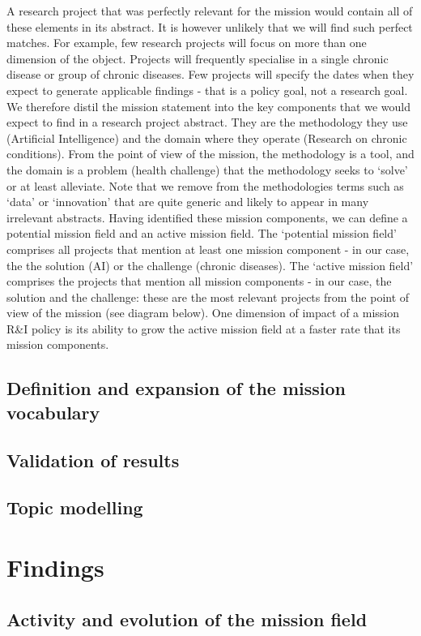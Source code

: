 \documentclass[11pt]{article}
\begin{document}
A research project that was perfectly relevant for the mission would contain all of these elements in its abstract. It is however unlikely that we will find such perfect matches. For example, few research projects will focus on more than one dimension of the object. Projects will frequently specialise in a single chronic disease or group of chronic diseases. Few projects will specify the dates when they expect to generate applicable findings - that is a policy goal, not a research goal. We therefore distil the mission statement into the key components that
we would expect to find in a research project abstract. They are the methodology they use (Artificial Intelligence) and the domain where they operate (Research on chronic conditions). From the point of view of the mission, the methodology is a tool, and the domain is a problem (health challenge) that the methodology seeks to `solve’ or at least alleviate. Note that we remove from the methodologies terms such as ‘data’ or ‘innovation’ that are quite generic and likely to appear in many irrelevant abstracts. Having identified these mission components, we can define a potential mission field and an active mission field. The `potential mission field' comprises all projects that mention at least one mission component - in our case, the the solution (AI) or the challenge (chronic diseases). The `active mission field’ comprises the projects that mention all mission components - in our case, the solution and the challenge: these are the most relevant projects from the point of view of the mission (see diagram below). One dimension of impact of a mission R\&I policy is its ability to grow the active mission field at a faster rate that its mission components.


\subsection{Definition and expansion of the mission vocabulary}
\subsection{Validation of results}
\subsection{Topic modelling}
\section{Findings}
\subsection{Activity and evolution of the mission field}
\end{document}
